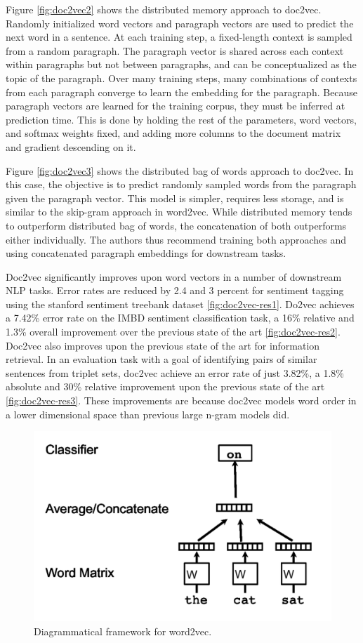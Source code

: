 Figure \ref{fig:doc2vec2} shows the distributed memory approach to doc2vec. Randomly initialized word vectors and paragraph vectors are used to predict the next word in a sentence. At each training step, a fixed-length context is sampled from a random paragraph. The paragraph vector is shared across each context within paragraphs but not between paragraphs, and can be conceptualized as the topic of the paragraph. Over many training steps, many combinations of contexts from each paragraph converge to learn the embedding for the paragraph. Because paragraph vectors are learned for the training corpus, they must be inferred at prediction time. This is done by holding the rest of the parameters, word vectors, and softmax weights fixed, and adding more columns to the document matrix and gradient descending on it.

Figure \ref{fig:doc2vec3} shows the distributed bag of words approach to doc2vec. In this case, the objective is to predict randomly sampled words from the paragraph given the paragraph vector. This model is simpler, requires less storage, and is similar to the skip-gram approach in word2vec. While distributed memory tends to outperform distributed bag of words, the concatenation of both outperforms either individually. The authors thus recommend training both approaches and using concatenated paragraph embeddings for downstream tasks.

Doc2vec significantly improves upon word vectors in a number of downstream NLP tasks. Error rates are reduced by 2.4 and 3 percent for sentiment tagging using the stanford sentiment treebank dataset \ref{fig:doc2vec-res1}. Do2vec achieves a 7.42\% error rate on the IMBD sentiment classification task, a 16\% relative and 1.3\% overall improvement over the previous state of the art \ref{fig:doc2vec-res2}. Doc2vec also improves upon the previous state of the art for information retrieval. In an evaluation task with a goal of identifying pairs of similar sentences from triplet sets, doc2vec achieve an error rate of just 3.82\%, a 1.8\% absolute and 30\% relative improvement upon the previous state of the art \ref{fig:doc2vec-res3}. These improvements are because doc2vec models word order in a lower dimensional space than previous large n-gram models did.

\begin{figure}
\centering
  \includegraphics[width=.5\linewidth]{files/doc2vec-1.png}
  \caption{Diagrammatical framework for word2vec.}
  \label{fig:vae}
\end{figure}

